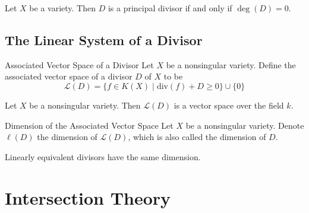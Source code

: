 \documentclass[a4paper]{article}
\begin{document}
\begin{prp}{}{} Let $X$ be a variety. Then $D$ is a principal divisor if and only if $\deg(D)=0$. 
\end{prp}

\subsection{The Linear System of a Divisor}
\begin{defn}{Associated Vector Space of a Divisor}{} Let $X$ be a nonsingular variety. Define the associated vector space of a divisor $D$ of $X$ to be $$\mathcal{L}(D)=\{f\in K(X)\;|\;\text{div}(f)+D\geq 0\}\cup\{0\}$$
\end{defn}

\begin{lmm}{}{} Let $X$ be a nonsingular variety. Then $\mathcal{L}(D)$ is a vector space over the field $k$. 
\end{lmm}

\begin{defn}{Dimension of the Associated Vector Space}{} Let $X$ be a nonsingular variety. Denote $\ell(D)$ the dimension of $\mathcal{L}(D)$, which is also called the dimension of $D$. 
\end{defn}

\begin{thm}{}{} Linearly equivalent divisors have the same dimension. 
\end{thm}

\pagebreak
\section{Intersection Theory}
\end{document}
